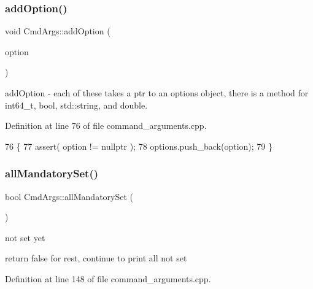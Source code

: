 \subsubsection{\texorpdfstring{add\+Option()}{addOption()}}
{\footnotesize\ttfamily void Cmd\+Args\+::add\+Option (\begin{DoxyParamCaption}\item[{\hyperlink{class_option_base}{Option\+Base} $\ast$}]{option }\end{DoxyParamCaption})}

add\+Option -\/ each of these takes a ptr to an options object, there is a method for int64\+\_\+t, bool, std\+::string, and double. 

Definition at line 76 of file command\+\_\+arguments.\+cpp.


\begin{DoxyCode}
76                                     \{
77    assert( option != \textcolor{keyword}{nullptr} );
78    options.push\_back(option);
79 \}
\end{DoxyCode}
\hypertarget{class_cmd_args_af8460dc8b1ec7eb745d256f6e80afc2e}{}\label{class_cmd_args_af8460dc8b1ec7eb745d256f6e80afc2e} 
\subsubsection{\texorpdfstring{all\+Mandatory\+Set()}{allMandatorySet()}}
{\footnotesize\ttfamily bool Cmd\+Args\+::all\+Mandatory\+Set (\begin{DoxyParamCaption}{ }\end{DoxyParamCaption})}

not set yet

return false for rest, continue to print all not set 

Definition at line 148 of file command\+\_\+arguments.\+cpp.


